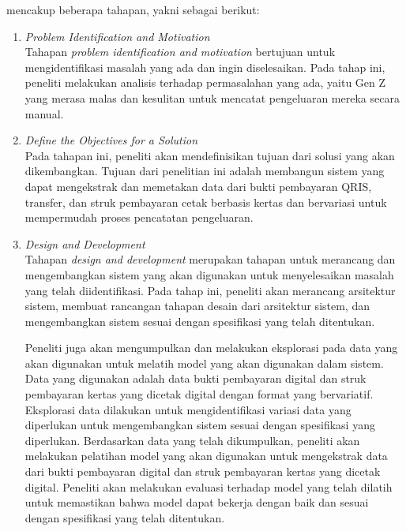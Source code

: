 \dsrm{} mencakup beberapa tahapan, yakni sebagai berikut:
\begin{enumerate}
	\item \emph{Problem Identification and Motivation}~\\
	      Tahapan \emph{problem identification and motivation} bertujuan untuk mengidentifikasi masalah yang ada dan ingin diselesaikan. Pada tahap ini, peneliti melakukan analisis terhadap permasalahan yang ada, yaitu Gen Z yang merasa malas dan kesulitan untuk mencatat pengeluaran mereka secara manual.
	\item \emph{Define the Objectives for a Solution}~\\
	      Pada tahapan ini, peneliti akan mendefinisikan tujuan dari solusi yang akan dikembangkan. Tujuan dari penelitian ini adalah membangun sistem yang dapat mengekstrak dan memetakan data dari bukti pembayaran QRIS, transfer, dan struk pembayaran cetak berbasis kertas dan bervariasi untuk mempermudah proses pencatatan pengeluaran.
	\item \emph{Design and Development}~\\
	      Tahapan \emph{design and development} merupakan tahapan untuk merancang dan mengembangkan sistem yang akan digunakan untuk menyelesaikan masalah yang telah diidentifikasi. Pada tahap ini, peneliti akan merancang arsitektur sistem, membuat rancangan tahapan desain dari arsitektur sistem, dan mengembangkan sistem sesuai dengan spesifikasi yang telah ditentukan.
		  
		  Peneliti juga akan mengumpulkan dan melakukan eksplorasi pada data yang akan digunakan untuk melatih model \dl{} yang akan digunakan dalam sistem. Data yang digunakan adalah data bukti pembayaran digital dan struk pembayaran kertas yang dicetak digital dengan format yang bervariatif. Eksplorasi data dilakukan untuk mengidentifikasi variasi data yang diperlukan untuk mengembangkan sistem sesuai dengan spesifikasi yang diperlukan. Berdasarkan data yang telah dikumpulkan, peneliti akan melakukan pelatihan model \dl{} yang akan digunakan untuk mengekstrak data dari bukti pembayaran digital dan struk pembayaran kertas yang dicetak digital. Peneliti akan melakukan evaluasi terhadap model yang telah dilatih untuk memastikan bahwa model dapat bekerja dengan baik dan sesuai dengan spesifikasi yang telah ditentukan.


\end{enumerate}
